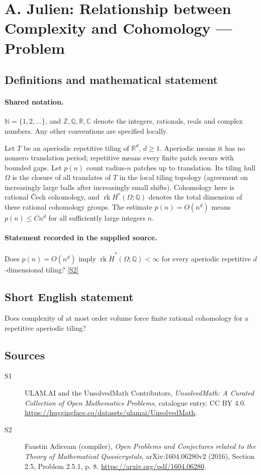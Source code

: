 \documentclass[11pt]{article}
\newcommand{\sref}[2]{\hyperlink{source:#1:#2}{[S#2]}}
\begin{document}
\section{A. Julien: Relationship between Complexity and Cohomology — Problem}\label{statement}

\subsection{Definitions and mathematical statement}

\paragraph{Shared notation.}$\mathbb N=\{1,2,\ldots\}$, and $\mathbb Z,\mathbb Q,\mathbb R,\mathbb C$ denote the integers, rationals, reals and complex numbers. Any other conventions are specified locally.


Let $T$ be an aperiodic repetitive tiling of $\mathbb R^d$, $d\geq1$. Aperiodic means it has no nonzero translation period; repetitive means every finite patch recurs with bounded gaps. Let $p(n)$ count radius-$n$ patches up to translation. Its tiling hull $\Omega$ is the closure of all translates of $T$ in the local tiling topology (agreement on increasingly large balls after increasingly small shifts). Cohomology here is rational Čech cohomology, and $\operatorname{rk}H^*(\Omega;\mathbb Q)$ denotes the total dimension of these rational cohomology groups. The estimate $p(n)=O(n^d)$ means $p(n)\leq Cn^d$ for all sufficiently large integers $n$.
\paragraph{Statement recorded in the supplied source.}
Does $p(n)=O(n^d)$ imply $\operatorname{rk}\check H^*(\Omega;\mathbb Q)<\infty$ for every aperiodic repetitive $d$-dimensional tiling? \sref{statement}{2}
\subsection{Short English statement}
Does complexity of at most order volume force finite rational cohomology for a repetitive aperiodic tiling?
\subsection{Sources}
\begin{description}
\item[\hypertarget{source:statement:1}{S1}] ULAM.AI and the UnsolvedMath Contributors, \emph{UnsolvedMath: A Curated Collection of Open Mathematics Problems}, catalogue entry. CC BY 4.0. \url{https://huggingface.co/datasets/ulamai/UnsolvedMath}.
\item[\hypertarget{source:statement:2}{S2}] Faustin Adiceam (compiler), \emph{Open Problems and Conjectures related to the Theory of Mathematical Quasicrystals}, arXiv:1604.06280v2 (2016), Section 2.5, Problem 2.5.1, p. 8. \url{https://arxiv.org/pdf/1604.06280}.
\end{description}
\label{end:statement}
\end{document}
